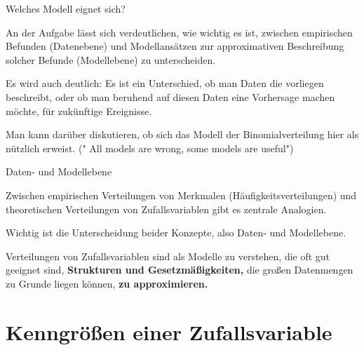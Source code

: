 \documentclass[usenames,dvipsnames,handout]{beamer}
\begin{document}
\begin{frame}{Welches Modell eignet sich?}
\begin{description}
\item{An der Aufgabe lässt sich verdeutlichen, wie wichtig es ist, zwischen empirischen Befunden (Datenebene) und
Modellansätzen zur approximativen Beschreibung solcher Befunde (Modellebene) zu unterscheiden.}\pause
\item{Es wird auch deutlich: Es ist ein Unterschied, ob man Daten die vorliegen beschreibt, oder ob man beruhend auf 
diesen Daten eine Vorhersage machen möchte, für zukünftige Ereignisse.}\pause
\item{Man kann darüber diskutieren, ob sich das Modell der Binomialverteilung hier als nützlich erweist. (" All models are wrong, some models are useful")}\pause
\end{description}
\end{frame}

\begin{frame}{Daten- und Modellebene}%
\begin{description}
\item{Zwischen empirischen Verteilungen von Merkmalen (Häufigkeitsverteilungen) und theoretischen
Verteilungen von Zufallsvariablen gibt es zentrale Analogien.}\pause
\item{Wichtig ist die Unterscheidung beider Konzepte, also Daten- und Modellebene.}\pause
\item{Verteilungen von Zufallsvariablen sind als Modelle zu verstehen, die oft gut geeignet sind, \textbf{Strukturen und Gesetzmäßigkeiten,}
die großen Datenmengen zu Grunde liegen können, \textbf{zu approximieren.}}
\end{description}
\end{frame}
\section{Kenngrößen  einer Zufallsvariable}
\end{document}
